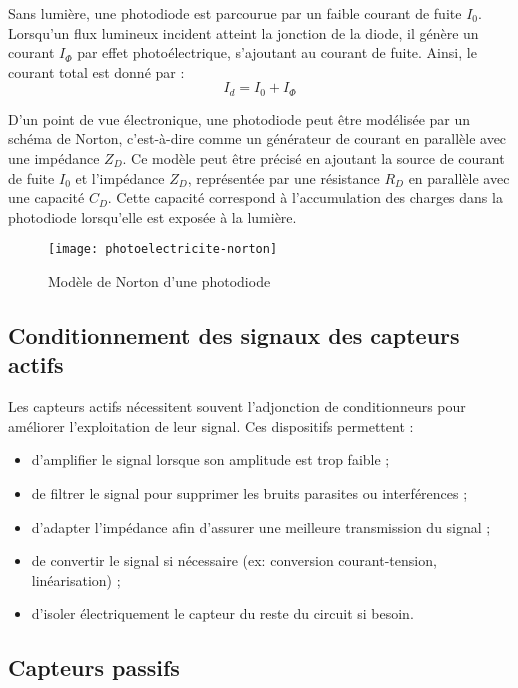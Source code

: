 Sans lumière, une photodiode est parcourue par un faible courant de fuite $I_0$. 
Lorsqu'un flux lumineux incident atteint la jonction de la diode, il génère un 
courant $I_\Phi$ par effet photoélectrique, s'ajoutant au courant de fuite. 
Ainsi, le courant total est donné par :
\[
I_d = I_0 + I_\Phi
\]

D'un point de vue électronique, une photodiode peut être modélisée par un schéma 
de Norton, c'est-à-dire comme un générateur de courant en parallèle avec une 
impédance $Z_D$. Ce modèle peut être précisé en ajoutant la source de courant de 
fuite $I_0$ et l'impédance $Z_D$, représentée par une résistance $R_D$ en 
parallèle avec une capacité $C_D$. Cette capacité correspond à l'accumulation 
des charges dans la photodiode lorsqu'elle est exposée à la lumière.

\begin{figure}[H]
    \centering
    \texttt{[image: photoelectricite-norton]}
    \caption{Modèle de Norton d'une photodiode}
    \label{fig:photodiode_norton}
\end{figure}

\subsection{Conditionnement des signaux des capteurs actifs}
Les capteurs actifs nécessitent souvent l'adjonction de conditionneurs pour améliorer l'exploitation de leur signal. Ces dispositifs permettent :
\begin{itemize}
    \item d'amplifier le signal lorsque son amplitude est trop faible ;
    \item de filtrer le signal pour supprimer les bruits parasites ou interférences ;
    \item d'adapter l'impédance afin d'assurer une meilleure transmission du signal ;
    \item de convertir le signal si nécessaire (ex: conversion courant-tension, linéarisation) ;
    \item d'isoler électriquement le capteur du reste du circuit si besoin.
\end{itemize}

\subsection{Capteurs passifs}

